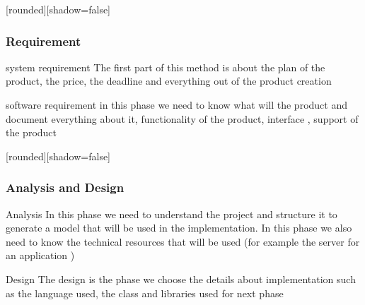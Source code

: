 \documentclass[10pt]{beamer}
\begin{document}




\begin{frame}[plain]
[rounded][shadow=false]
\frametitle{Requirement}

\begin{block}{system requirement}
The first part of this method is about the plan of the product, the price, the deadline and everything out of the product creation
\end{block}

\begin{block}{software requirement}
in this phase we need to know what will the product and document everything about it, functionality of the product, interface , support of the product  
\end{block}
\end{frame}
\begin{frame}[plain]
[rounded][shadow=false]
\frametitle{Analysis and Design}

\begin{block}{Analysis}
In this phase we need to understand the project and structure it to generate a model that will be used in the implementation. In this phase we also need to know the technical resources that will be used (for example the server for an application )
\end{block}
\begin{block}{Design}
The design is the phase we choose the details about implementation such as the language used, the class and libraries used for next phase

\end{block}
\end{frame}




\end{document}
